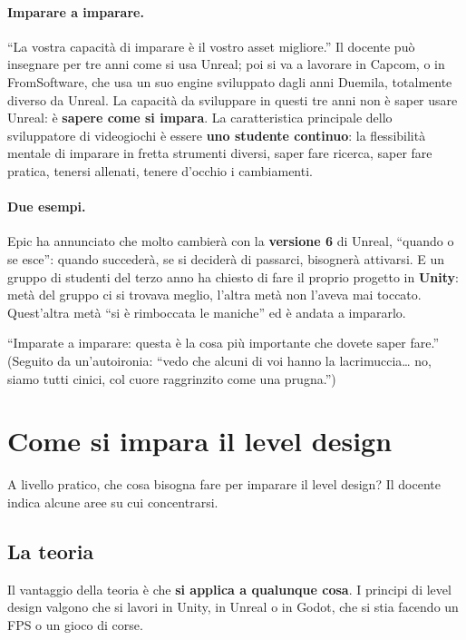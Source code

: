 \paragraph{Imparare a imparare.} ``La vostra capacità di imparare è il vostro
asset migliore.'' Il docente può insegnare per tre anni come si usa Unreal;
poi si va a lavorare in Capcom, o in FromSoftware, che usa un suo engine
sviluppato dagli anni Duemila, totalmente diverso da Unreal. La capacità da
sviluppare in questi tre anni non è saper usare Unreal: è \textbf{sapere come
si impara}. La caratteristica principale dello sviluppatore di videogiochi è
essere \textbf{uno studente continuo}: la flessibilità mentale di imparare in
fretta strumenti diversi, saper fare ricerca, saper fare pratica, tenersi
allenati, tenere d'occhio i cambiamenti.

\paragraph{Due esempi.} Epic ha annunciato che molto cambierà con la
\textbf{versione 6} di Unreal, ``quando o se esce'': quando succederà, se si
deciderà di passarci, bisognerà attivarsi. E un gruppo di studenti del terzo
anno ha chiesto di fare il proprio progetto in \textbf{Unity}: metà del gruppo
ci si trovava meglio, l'altra metà non l'aveva mai toccato. Quest'altra metà
``si è rimboccata le maniche'' ed è andata a impararlo.

``Imparate a imparare: questa è la cosa più importante che dovete saper
fare.'' (Seguito da un'autoironia: ``vedo che alcuni di voi hanno la
lacrimuccia\dots{} no, siamo tutti cinici, col cuore raggrinzito come una
prugna.'')

\section{Come si impara il level design}
\label{gd8:sec:imparare}

A livello pratico, che cosa bisogna fare per imparare il level design? Il
docente indica alcune aree su cui concentrarsi.

\subsection{La teoria}

Il vantaggio della teoria è che \textbf{si applica a qualunque cosa}. I
principi di level design valgono che si lavori in Unity, in Unreal o in Godot,
che si stia facendo un FPS o un gioco di corse.

